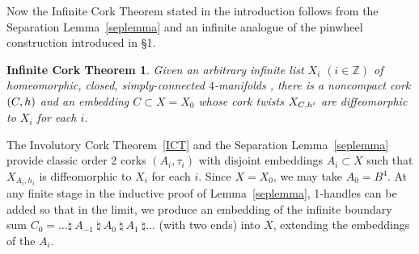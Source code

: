 \documentclass[11pt]{amsart}
\newtheorem*{icthm*}{Infinite Cork Theorem}
\theoremstyle{definition}
\newcommand{\thmref}[1]{Theorem~\ref{#1}}
\newcommand{\lemref}[1]{Lemma~\ref{#1}}
\newcommand{\bz}{\mathbb Z}
\newcommand{\del}{\partial}
\begin{document}

Now the Infinite Cork Theorem stated in the introduction follows from the Separation \lemref{seplemma} and an infinite analogue of the pinwheel construction introduced in \S1.

\begin{icthm*}\label{icthm}
Given an arbitrary infinite list $X_i$ $(i\in \bz)$ of homeomorphic, closed, simply-connected $4$-manifolds , there is a noncompact cork $(C,h)$ and an embedding $C \subset X= X_0$ whose cork twists $X_{C,h^i}$ are diffeomorphic to $X_i$ for each $i$.
\end{icthm*}

\proof 
The Involutory Cork \thmref{ICT} and the Separation \lemref{seplemma} provide classic order 2 corks $(A_i, \tau_i)$ with disjoint embeddings $A_i \subset X$ such that $X_{A_i, h_i}$ is diffeomorphic to $X_i$ for each $i$.  Since $X = X_0$, we may take $A_0 = B^4$.   At any finite stage in the inductive  proof of \lemref{seplemma}, 1-handles can be added so that in the limit, we produce an embedding of the infinite boundary sum $C_0= \dots \natural~ A_{-1} ~\natural~ A_0 ~\natural~ A_1~ \natural \dots$ (with two ends) into $X$, extending the embeddings of the $A_i$. 
 
\end{document}
